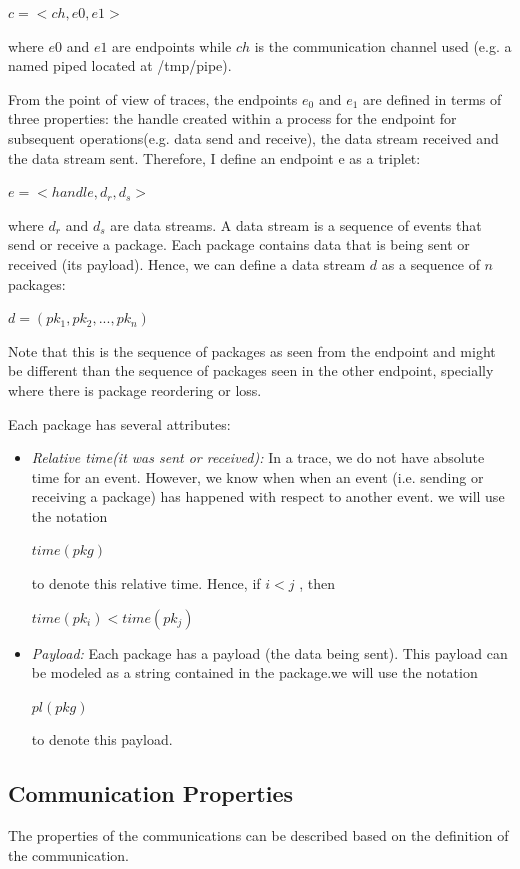 $c =<ch, e0, e1>$

where $e0$ and $e1$ are endpoints while $ch$ is the communication channel used (e.g. a named piped located at /tmp/pipe).

From the point of view of traces, the endpoints $e_0$ and $e_1$ are defined in terms of three properties: the handle created within a process for the endpoint for subsequent operations(e.g. data send and receive), the data stream received and the data stream sent. Therefore, I define an endpoint e as a triplet:

$ e =<handle, d_r, d_s>$

where $d_r$ and $d_s$ are data streams. A data stream is a sequence of events that send or receive a package. Each package contains data that is being sent or received (its payload). Hence, we can define a data stream $d$ as a sequence of $n$ packages:

$ d = (pk_1, pk_2, ..., pk_n)$ 

Note that this is the sequence of packages as seen from the endpoint and might be different than the sequence of packages seen in the other endpoint, specially where there is package reordering or loss.

Each package has several attributes:
\begin{itemize}
\item \textit{Relative time(it was sent or received):} In a trace, we do not have absolute time for an event. However, we know when when an event (i.e. sending or receiving a package) has happened with respect to another event. we will use the notation 

$time(pkg)$ 

to denote this relative time. Hence, if  $i < j $ , then 

$time(pk_i) < time(pk_j)$

\item \textit{Payload:} Each package has a payload (the data being sent). This payload can be modeled as a string contained in the package.we will use the notation 

$pl(pkg)$ 

to denote this payload. 

\end{itemize}


\subsection{Communication Properties}
The properties of the communications can be described based on the definition of the communication.

